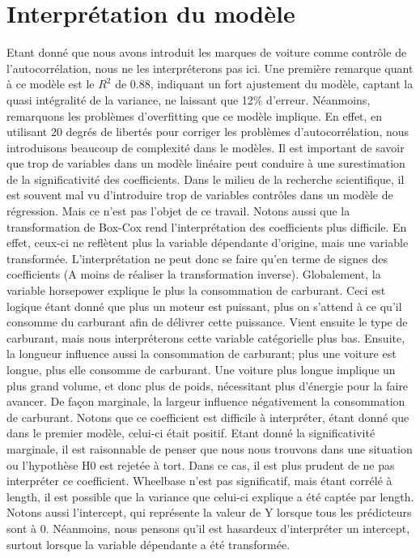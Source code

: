 \documentclass[11pt,a4paper]{article}
\begin{document}
\section{Interprétation du modèle} Etant donné que nous avons introduit les marques de voiture comme contrôle de l'autocorrélation, nous ne les interpréterons pas ici.
Une première remarque quant à ce modèle est le $R^2$ de 0.88, indiquant un fort ajustement du modèle, captant la quasi intégralité de la variance, ne laissant que 12\% d'erreur.
Néanmoins, remarquons les problèmes d'overfitting que ce modèle implique. En effet, en utilisant 20 degrés de libertés pour corriger les problèmes d'autocorrélation, nous introduisons beaucoup de complexité dans le modèles. Il est important de savoir que trop de variables dans un modèle linéaire peut conduire à une surestimation de la significativité des coefficients. Dans le milieu de la recherche scientifique, il est souvent mal vu d'introduire trop de variables contrôles dans un modèle de régression. Mais ce n'est pas l'objet de ce travail. Notons aussi que la transformation de Box-Cox rend l'interprétation des coefficients plus difficile. En effet, ceux-ci ne reflètent plus la variable dépendante d'origine, mais une variable transformée. L'interprétation ne peut donc se faire qu'en terme de signes des coefficients (A moins de réaliser la transformation inverse).
Globalement,  la variable horsepower explique le plus la consommation de carburant. Ceci est logique étant donné que plus un moteur est puissant, plus on s'attend à ce qu'il consomme du carburant afin de délivrer cette puissance. Vient ensuite le type de carburant, mais nous interpréterons cette variable catégorielle plus bas. Ensuite, la longueur influence aussi la consommation de carburant; plus une voiture est longue, plus elle consomme de carburant. Une voiture plus longue implique un plus grand volume, et donc plus de poids, nécessitant plus d'énergie pour la faire avancer. De façon marginale, la largeur influence négativement la consommation de carburant. Notons que ce coefficient est difficile à interpréter, étant donné que dans le premier modèle, celui-ci était positif. Etant donné la significativité marginale, il est raisonnable de penser que nous nous trouvons dans une situation ou l'hypothèse H0 est rejetée à tort. Dans ce cas, il est plus prudent de ne pas interpréter ce coefficient. Wheelbase n'est pas significatif, mais étant corrélé à length, il est possible que la variance que celui-ci explique a été captée par length. Notons aussi l'intercept, qui représente la valeur de Y lorsque tous les prédicteurs sont à 0. Néanmoins, nous pensons qu'il est hasardeux d'interpréter un intercept, surtout lorsque la variable dépendante a été transformée.
\end{document}
